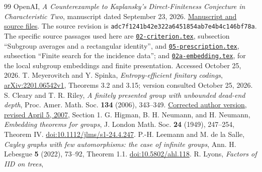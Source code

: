 \documentclass[11pt,a4paper]{article}
\numberwithin{equation}{section}
\begin{document}
\begin{thebibliography}{99}
OpenAI,
\emph{A Counterexample to Kaplansky's Direct-Finiteness Conjecture in
Characteristic Two}, manuscript dated September 23, 2026.
\href{https://github.com/openai/math/tree/adc7f1241b42e322a6451854ab7e4b4c146bf78a/preprints/A-Counterexample-to-Kaplanskys-Direct-Finiteness-Conjecture-in-Characteristic-Two-September-23-2026}{Manuscript and source files}.
The source revision is \texttt{adc7f1241b42e322a6451854ab7e4b4c146bf78a}.
The specific source passages used here are
\href{https://raw.githubusercontent.com/openai/math/adc7f1241b42e322a6451854ab7e4b4c146bf78a/preprints/A-Counterexample-to-Kaplanskys-Direct-Finiteness-Conjecture-in-Characteristic-Two-September-23-2026/build/sections/02-criterion.tex}{\texttt{02-criterion.tex}},
subsection ``Subgroup averages and a rectangular identity'', and
\href{https://raw.githubusercontent.com/openai/math/adc7f1241b42e322a6451854ab7e4b4c146bf78a/preprints/A-Counterexample-to-Kaplanskys-Direct-Finiteness-Conjecture-in-Characteristic-Two-September-23-2026/build/sections/05-prescription.tex}{\texttt{05-prescription.tex}},
subsection ``Finite search for the incidence data''; and
\href{https://raw.githubusercontent.com/openai/math/adc7f1241b42e322a6451854ab7e4b4c146bf78a/preprints/A-Counterexample-to-Kaplanskys-Direct-Finiteness-Conjecture-in-Characteristic-Two-September-23-2026/build/sections/02a-embedding.tex}{\texttt{02a-embedding.tex}},
for the local subgroup embeddings and finite presentation.
Accessed October 25, 2026.
T. Meyerovitch and Y. Spinka,
\emph{Entropy-efficient finitary codings},
\href{https://arxiv.org/abs/2201.06542}{arXiv:2201.06542v1},
Theorems 3.2 and 3.15; version consulted October 25, 2026.
S. Cleary and T. R. Riley,
\emph{A finitely presented group with unbounded dead-end depth},
Proc. Amer. Math. Soc. \textbf{134} (2006), 343--349.
\href{https://pi.math.cornell.edu/~riley/papers/Dead-End_Depth/deadend_corrected.pdf}
{Corrected author version, revised April 5, 2007}, Section 1.
G. Higman, B. H. Neumann, and H. Neumann,
\emph{Embedding theorems for groups},
J. London Math. Soc. \textbf{24} (1949), 247--254, Theorem IV.
\href{https://doi.org/10.1112/jlms/s1-24.4.247}{doi:10.1112/jlms/s1-24.4.247}.
P.-H. Leemann and M. de la Salle,
\emph{Cayley graphs with few automorphisms: the case of infinite groups},
Ann. H. Lebesgue \textbf{5} (2022), 73--92, Theorem 1.1.
\href{https://doi.org/10.5802/ahl.118}{doi:10.5802/ahl.118}.
R. Lyons, \emph{Factors of IID on trees},

\end{thebibliography}
\end{document}
